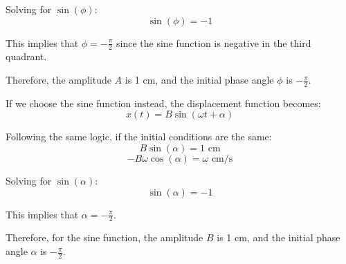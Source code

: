\documentclass[journal,12pt,twocolumn]{IEEEtran}
\theoremstyle{remark}
\begin{document}
Solving for \(\sin(\phi)\):
\[ \sin(\phi) = -1 \]

This implies that \(\phi = -\frac{\pi}{2}\) since the sine function is negative in the third quadrant.

Therefore, the amplitude \(A\) is 1 cm, and the initial phase angle \(\phi\) is \(-\frac{\pi}{2}\).

If we choose the sine function instead, the displacement function becomes:
\[ x(t) = B \sin(\omega t + \alpha) \]

Following the same logic, if the initial conditions are the same:
\[ B \sin(\alpha) = 1 \text{ cm} \]
\[ -B \omega \cos(\alpha) = \omega \text{ cm/s} \]

Solving for \(\sin(\alpha)\):
\[ \sin(\alpha) = -1 \]

This implies that \(\alpha = -\frac{\pi}{2}\).

Therefore, for the sine function, the amplitude \(B\) is 1 cm, and the initial phase angle \(\alpha\) is \(-\frac{\pi}{2}\).
\end{document}

